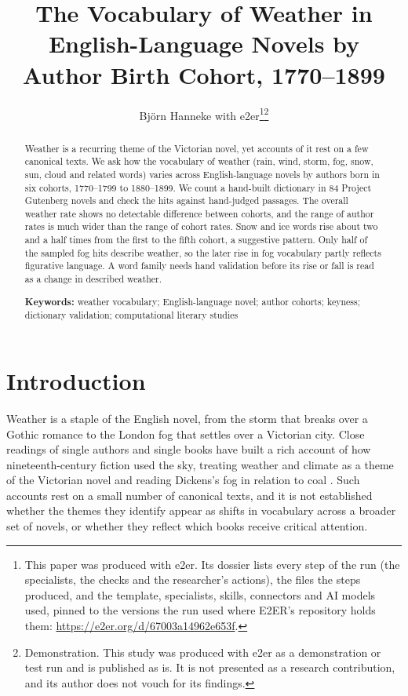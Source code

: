 \documentclass[11pt]{article}
\title{The Vocabulary of Weather in English-Language Novels by Author Birth Cohort, 1770--1899}
\author{Björn Hanneke with e2er\thanks{This paper was produced with e2er. Its dossier lists every step of the run (the specialists, the checks and the researcher's actions), the files the steps produced, and the template, specialists, skills, connectors and AI models used, pinned to the versions the run used where E2ER's repository holds them: \url{https://e2er.org/d/67003a14962e653f}.}\thanks{Demonstration. This study was produced with e2er as a demonstration or test run and is published as is. It is not presented as a research contribution, and its author does not vouch for its findings.}}
\date{}
\begin{document}
\maketitle

\begin{abstract}
\noindent
Weather is a recurring theme of the Victorian novel, yet accounts of it rest on a few canonical texts. We ask how the vocabulary of weather (rain, wind, storm, fog, snow, sun, cloud and related words) varies across English-language novels by authors born in six cohorts, 1770--1799 to 1880--1899. We count a hand-built dictionary in 84 Project Gutenberg novels and check the hits against hand-judged passages.
The overall weather rate shows no detectable difference between cohorts, and the range of author rates is much wider than the range of cohort rates.
Snow and ice words rise about two and a half times from the first to the fifth cohort, a suggestive pattern.
Only half of the sampled fog hits describe weather, so the later rise in fog vocabulary partly reflects figurative language.
A word family needs hand validation before its rise or fall is read as a change in described weather.

\medskip
\noindent\textbf{Keywords:} weather vocabulary; English-language novel; author cohorts; keyness; dictionary validation; computational literary studies
\end{abstract}

\section{Introduction}

Weather is a staple of the English novel, from the storm that breaks over a Gothic romance to the London fog that settles over a Victorian city. Close readings of single authors and single books have built a rich account of how nineteenth-century fiction used the sky, treating weather and climate as a theme of the Victorian novel and reading Dickens's fog in relation to coal \citep{waugh2008talking, laughlin2020fog}. Such accounts rest on a small number of canonical texts, and it is not established whether the themes they identify appear as shifts in vocabulary across a broader set of novels, or whether they reflect which books receive critical attention.
\end{document}
